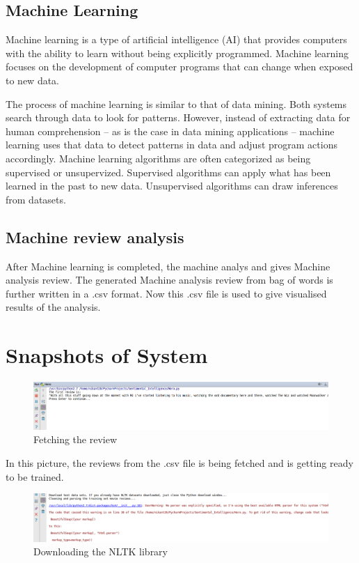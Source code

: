 \subsection{Machine Learning}
Machine learning is a type of artificial intelligence (AI) that provides computers with the ability to learn without being explicitly programmed. Machine learning focuses on the development of computer programs that can change when exposed to new data.

The process of machine learning is similar to that of data mining. Both systems search through data to look for patterns. However, instead of extracting data for human comprehension -- as is the case in data mining applications -- machine learning uses that data to detect patterns in data and adjust program actions accordingly.  Machine learning algorithms are often categorized as being supervised or unsupervized. Supervised algorithms can apply what has been learned in the past to new data. Unsupervised algorithms can draw inferences from datasets.

\subsection{Machine review analysis}

After Machine learning is completed, the machine analys and gives Machine analysis review. The generated Machine analysis review from bag of words is further written in a .csv format. Now this .csv file is used to give visualised results of the analysis.
\section{Snapshots of System}
\begin{figure}[h]
	\centering
	\includegraphics[width=1\linewidth]{1st}
	\caption{Fetching the review}
	\end{figure}
In this picture, the reviews from the .csv file is being fetched and is getting ready to be trained.\\
\begin{figure}[h]
	\centering
	\includegraphics[width=1\linewidth]{2nd}
	\caption{Downloading the NLTK library}
\end{figure}

